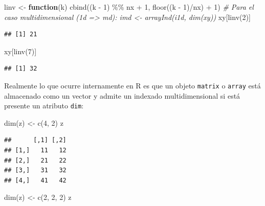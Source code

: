 \documentclass[
]{book}
\newenvironment{Shaded}{\begin{snugshade}}{\end{snugshade}}
\newcommand{\CommentTok}[1]{\textcolor[rgb]{0.56,0.35,0.01}{\textit{#1}}}
\newcommand{\ControlFlowTok}[1]{\textcolor[rgb]{0.13,0.29,0.53}{\textbf{#1}}}
\newcommand{\DecValTok}[1]{\textcolor[rgb]{0.00,0.00,0.81}{#1}}
\newcommand{\FunctionTok}[1]{\textcolor[rgb]{0.00,0.00,0.00}{#1}}
\newcommand{\NormalTok}[1]{#1}
\newcommand{\OtherTok}[1]{\textcolor[rgb]{0.56,0.35,0.01}{#1}}
\newcommand{\SpecialCharTok}[1]{\textcolor[rgb]{0.00,0.00,0.00}{#1}}
\theoremstyle{break}
\theoremstyle{nonumberplain}
\begin{document}
\begin{Shaded}
\begin{Highlighting}[]
\NormalTok{linv }\OtherTok{\textless{}{-}} \ControlFlowTok{function}\NormalTok{(k) }\FunctionTok{cbind}\NormalTok{((k }\SpecialCharTok{{-}} \DecValTok{1}\NormalTok{) }\SpecialCharTok{\%\%}\NormalTok{ nx }\SpecialCharTok{+} \DecValTok{1}\NormalTok{, }\FunctionTok{floor}\NormalTok{((k }\SpecialCharTok{{-}} \DecValTok{1}\NormalTok{)}\SpecialCharTok{/}\NormalTok{nx) }\SpecialCharTok{+} \DecValTok{1}\NormalTok{)}
\CommentTok{\# Para el caso multidimensional (1d =\textgreater{} md): imd \textless{}{-} arrayInd(i1d, dim(xy))}
\NormalTok{xy[}\FunctionTok{linv}\NormalTok{(}\DecValTok{2}\NormalTok{)]}
\end{Highlighting}
\end{Shaded}

\begin{verbatim}
## [1] 21
\end{verbatim}

\begin{Shaded}
\begin{Highlighting}[]
\NormalTok{xy[}\FunctionTok{linv}\NormalTok{(}\DecValTok{7}\NormalTok{)]}
\end{Highlighting}
\end{Shaded}

\begin{verbatim}
## [1] 32
\end{verbatim}

Realmente lo que ocurre internamente en R es que un objeto \texttt{matrix} o \texttt{array} está almacenado como un vector y admite un indexado multidimensional si está presente un atributo \texttt{dim}:

\begin{Shaded}
\begin{Highlighting}[]
\FunctionTok{dim}\NormalTok{(z) }\OtherTok{\textless{}{-}} \FunctionTok{c}\NormalTok{(}\DecValTok{4}\NormalTok{, }\DecValTok{2}\NormalTok{)}
\NormalTok{z}
\end{Highlighting}
\end{Shaded}

\begin{verbatim}
##      [,1] [,2]
## [1,]   11   12
## [2,]   21   22
## [3,]   31   32
## [4,]   41   42
\end{verbatim}

\begin{Shaded}
\begin{Highlighting}[]
\FunctionTok{dim}\NormalTok{(z) }\OtherTok{\textless{}{-}} \FunctionTok{c}\NormalTok{(}\DecValTok{2}\NormalTok{, }\DecValTok{2}\NormalTok{, }\DecValTok{2}\NormalTok{)}
\NormalTok{z}
\end{Highlighting}
\end{Shaded}
\end{document}
